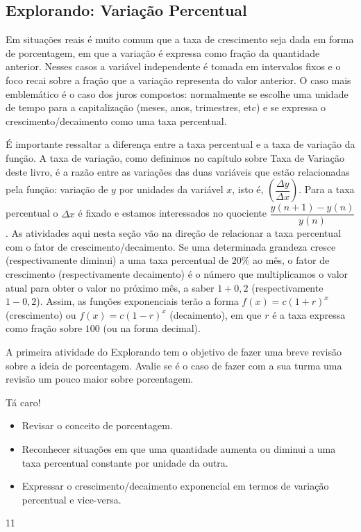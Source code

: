 \begin{texto}
{	\section{Explorando: Variação Percentual}
	Em situações reais é muito comum que a taxa de crescimento seja dada em forma de porcentagem, em que a variação é expressa como fração da quantidade anterior. Nesses casos a variável independente é tomada em intervalos fixos e o foco recai sobre a fração que a variação representa do valor anterior. O caso mais emblemático é o caso dos juros compostos: normalmente se escolhe uma unidade de tempo para a capitalização (meses, anos, trimestres, etc) e se expressa o crescimento/decaimento como uma taxa percentual.

	É importante ressaltar a diferença entre a taxa percentual e a taxa de variação da função. A taxa de variação, como definimos no capítulo sobre Taxa de Variação deste livro, é a razão entre as variações das duas variáveis que estão relacionadas pela função: variação de $y$ por unidades da variável $x$, isto é, $\left( \dfrac{\Delta{y}}{\Delta{x}}\right)$. Para a taxa percentual o $\Delta x$ é fixado e estamos interessados no quociente $\dfrac{y(n+1)-y(n)}{y(n)}$. As atividades aqui nesta seção vão na direção de relacionar a taxa percentual com o fator de crescimento/decaimento. Se uma determinada grandeza cresce (respectivamente diminui) a uma taxa percentual de $20\%$ ao mês, o fator de crescimento (respectivamente decaimento) é o número que multiplicamos o valor atual para obter o valor no próximo mês, a saber $1+0,2$ (respectivamente $1-0,2$). Assim, as funções exponenciais terão a forma $f(x)=c(1+r)^{x}$ (crescimento) ou $f(x)=c(1-r)^{x}$ (decaimento), em que $r$ é a taxa expressa como fração sobre $100$ (ou na forma decimal).

	A primeira atividade do Explorando tem o objetivo de fazer uma breve revisão sobre a ideia de porcentagem. Avalie se é o caso de fazer com a sua turma uma revisão um pouco maior sobre porcentagem.
}
\end{texto}
\begin{objectives}{Tá caro!}
{
	\begin{itemize}
	\item Revisar o conceito de porcentagem.

	\end{itemize}

	\begin{itemize}
	\item Reconhecer situações em que uma quantidade aumenta ou diminui a uma taxa percentual constante por unidade da outra.
	\item Expressar o crescimento/decaimento exponencial em termos de variação percentual e vice-versa.
	\end{itemize}
	}{1}{1}
\end{objectives}
